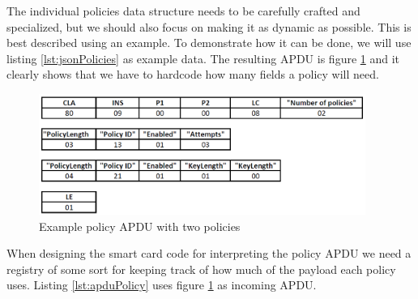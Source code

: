 The individual policies data structure needs to be carefully crafted and specialized, but we should also focus on making it as dynamic as possible. This is best described using an example. To demonstrate how it can be done, we will use listing \ref{lst:jsonPolicies} as example data. The resulting APDU is figure \ref{fig:policyAPDU} and it clearly shows that we have to hardcode how many fields a policy will need.

\begin{figure}[h!]
  \captionsetup{justification=centering,margin=1.5cm}
  \caption{Example policy APDU with two policies}
  \label{fig:policyAPDU}
  \centering
    \includegraphics[width=0.95\textwidth]{images/policyAPDU.png}
\end{figure}

When designing the smart card code for interpreting the policy APDU we need a registry of some sort for keeping track of how much of the payload each policy uses. Listing \ref{lst:apduPolicy} uses figure \ref{fig:policyAPDU} as incoming APDU.

